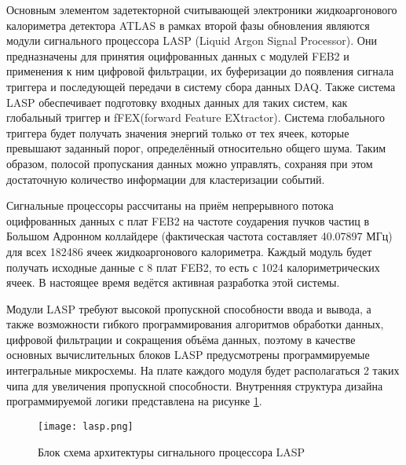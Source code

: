 Основным элементом задетекторной считывающей электроники жидкоаргонового калориметра детектора ATLAS в рамках второй фазы обновления являются модули сигнального процессора LASP (Liquid Argon Signal Processor). Они предназначены для принятия оцифрованных данных с модулей FEB2 и применения к ним цифровой фильтрации, их буферизации до появления сигнала триггера и последующей передачи в систему сбора данных DAQ. Также система LASP обеспечивает подготовку входных данных для таких систем, как глобальный триггер и fFEX(forward Feature EXtractor). Система глобального триггера будет получать значения энергий только от тех ячеек, которые превышают заданный порог, определённый относительно общего шума. Таким образом, полосой пропускания данных можно управлять, сохраняя при этом достаточную количество информации для кластеризации событий.\par
Сигнальные процессоры рассчитаны на приём непрерывного потока оцифрованных данных с плат FEB2 на частоте соударения пучков частиц в Большом Адронном коллайдере (фактическая частота составляет 40.07897 МГц) для всех 182486 ячеек жидкоаргонового калориметра. Каждый модуль будет получать исходные данные с 8 плат FEB2, то есть с 1024 калориметрических ячеек. В настоящее время ведётся активная разработка этой системы.\par
Модули LASP требуют высокой пропускной способности ввода и вывода, а также возможности гибкого программирования алгоритмов обработки данных, цифровой фильтрации и сокращения объёма данных, поэтому в качестве основных вычислительных блоков LASP предусмотрены программируемые интегральные микросхемы. На плате каждого модуля будет располагаться 2 таких чипа для увеличения пропускной способности. Внутренняя структура дизайна программируемой логики представлена на рисунке \ref{fig:lasp}.

\begin{figure}[ht]
    \centering
    \texttt{[image: lasp.png]}
    \caption{Блок схема архитектуры сигнального процессора LASP}
    \label{fig:lasp}
\end{figure}\par

